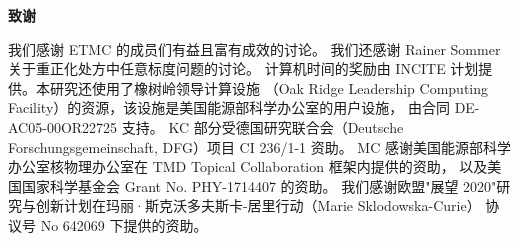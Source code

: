 
\vspace*{1cm}
\begin{center}
{\bf\large 致谢}
\end{center}
\medskip
我们感谢 ETMC 的成员们有益且富有成效的讨论。
我们还感谢 Rainer Sommer 关于重正化处方中任意标度问题的讨论。
计算机时间的奖励由 INCITE 计划提供。本研究还使用了橡树岭领导计算设施
（Oak Ridge Leadership Computing Facility）的资源，该设施是美国能源部科学办公室的用户设施，
由合同 DE-AC05-00OR22725 支持。
KC 部分受德国研究联合会（Deutsche Forschungsgemeinschaft, DFG）项目 CI 236/1-1 资助。
MC 感谢美国能源部科学办公室核物理办公室在 TMD Topical Collaboration 框架内提供的资助，
以及美国国家科学基金会 Grant No. PHY-1714407 的资助。
我们感谢欧盟"展望 2020"研究与创新计划在玛丽·斯克沃多夫斯卡-居里行动（Marie Sklodowska-Curie）
协议号 No 642069 下提供的资助。

